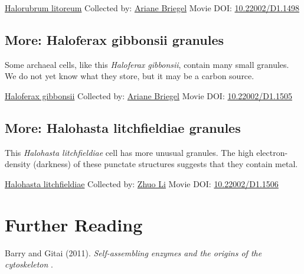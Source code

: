 \documentclass[]{tufte-book}
\begin{document}
\hypertarget{htmlwidget-0cc8d56d49fdde73bae7}{}

\label{fig:4-10}\protect\hyperlink{tree}{Halorubrum litoreum} Collected by: \protect\hyperlink{ariane_briegel}{Ariane Briegel} Movie DOI: \href{https://doi.org/10.22002/D1.1498}{10.22002/D1.1498}

\hypertarget{Haloferax_gibbonsii_granules}{%
\subsection*{More: Haloferax gibbonsii granules}\label{Haloferax_gibbonsii_granules}}

Some archaeal cells, like this \emph{Haloferax gibbonsii}, contain many small granules. We do not yet know what they store, but it may be a carbon source.



\hypertarget{htmlwidget-d06d5bff913d34d7a137}{}

\label{fig:4-10a}\protect\hyperlink{tree}{Haloferax gibbonsii} Collected by: \protect\hyperlink{ariane_briegel}{Ariane Briegel} Movie DOI: \href{https://doi.org/10.22002/D1.1505}{10.22002/D1.1505}

\hypertarget{Halohasta_litchfieldiae_granules}{%
\subsection*{More: Halohasta litchfieldiae granules}\label{Halohasta_litchfieldiae_granules}}

This \emph{Halohasta litchfieldiae} cell has more unusual granules. The high electron-density (darkness) of these punctate structures suggests that they contain metal.



\hypertarget{htmlwidget-831fc78d71b551d2846f}{}

\label{fig:4-10b}\protect\hyperlink{tree}{Halohasta litchfieldiae} Collected by: \protect\hyperlink{zhuo_li}{Zhuo Li} Movie DOI: \href{https://doi.org/10.22002/D1.1506}{10.22002/D1.1506}

\hypertarget{further-reading-3}{%
\section{Further Reading}\label{further-reading-3}}

Barry and Gitai (2011). \emph{Self-assembling enzymes and the origins of the cytoskeleton} \citep{barry2011}.
\end{document}
